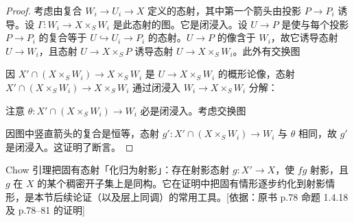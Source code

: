 \begin{proof}
考虑由复合 $W_i\to U_i\to X$ 定义的态射，其中第一个箭头由投影 $P\to P_i$ 诱导。设 $\Gamma\colon W_i\to X\times_S W_i$ 是此态射的图。它是闭浸入。设 $U\to P$ 是使与每个投影 $P\to P_i$ 的复合等于 $U\hookrightarrow U_i\to P_i$ 的态射。$U\to P$ 的像含于 $W_i$，故它诱导态射 $U\to W_i$，且态射 $U\to X\times_S P$ 诱导态射 $U\to X\times_S W_i$。此外有交换图
\begin{center}
\end{center}
因 $X'\cap(X\times_S W_i)\to X\times_S W_i$ 是 $U\to X\times_S W_i$ 的概形论像，态射 $X'\cap(X\times_S W_i)\to X\times_S W_i$ 通过闭浸入 $W_i\to X\times_S W_i$ 分解：
\begin{center}
\end{center}
注意 $\theta\colon X'\cap(X\times_S W_i)\to W_i$ 必是闭浸入。考虑交换图
\begin{center}
\end{center}
因图中竖直箭头的复合是恒等，态射 $g'\colon X'\cap(X\times_S W_i)\to W_i$ 与 $\theta$ 相同，故 $g'$ 是闭浸入。这证明了断言。
\end{proof}

\begin{tnote}
Chow 引理把固有态射「化归为射影」：存在射影态射 $g\colon X'\to X$，使 $fg$ 射影，且 $g$ 在 $X$ 的某个稠密开子集上是同构。它在证明中把固有情形逐步约化到射影情形，是本节后续论证（以及层上同调）的常用工具。[依据：原书 p.78 命题 1.4.18 及 p.78–81 的证明]
\end{tnote}

